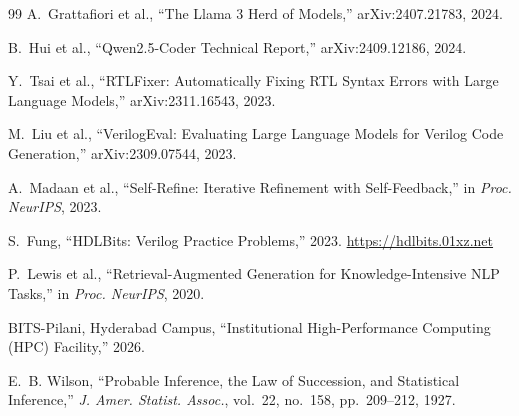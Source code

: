 \documentclass[11pt]{article}
\begin{document}
\begin{thebibliography}{99}
A.~Grattafiori et al., ``The Llama 3 Herd of Models,'' arXiv:2407.21783, 2024.

B.~Hui et al., ``Qwen2.5-Coder Technical Report,'' arXiv:2409.12186, 2024.

Y.~Tsai et al., ``RTLFixer: Automatically Fixing RTL Syntax Errors with Large
Language Models,'' arXiv:2311.16543, 2023.

M.~Liu et al., ``VerilogEval: Evaluating Large Language Models for Verilog Code
Generation,'' arXiv:2309.07544, 2023.

A.~Madaan et al., ``Self-Refine: Iterative Refinement with Self-Feedback,'' in
\emph{Proc. NeurIPS}, 2023.

S.~Fung, ``HDLBits: Verilog Practice Problems,'' 2023.
\url{https://hdlbits.01xz.net}

P.~Lewis et al., ``Retrieval-Augmented Generation for Knowledge-Intensive NLP
Tasks,'' in \emph{Proc. NeurIPS}, 2020.

BITS-Pilani, Hyderabad Campus, ``Institutional High-Performance Computing (HPC)
Facility,'' 2026.

E.~B. Wilson, ``Probable Inference, the Law of Succession, and Statistical
Inference,'' \emph{J. Amer. Statist. Assoc.}, vol.~22, no.~158, pp.~209--212,
1927.

\end{thebibliography}
\end{document}
